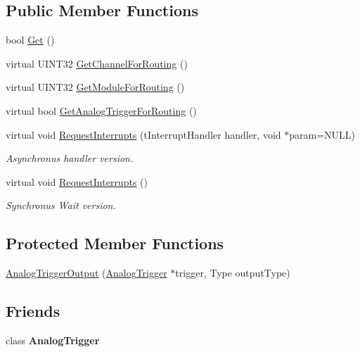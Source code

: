\subsection*{\-Public \-Member \-Functions}
\begin{DoxyCompactItemize}
\item 
bool \hyperlink{classAnalogTriggerOutput_a932c64e6e662803108a6a951b3809ad0}{\-Get} ()
\item 
virtual \-U\-I\-N\-T32 \hyperlink{classAnalogTriggerOutput_a5a3c5233ce579ae4d84098f08abd808a}{\-Get\-Channel\-For\-Routing} ()
\item 
virtual \-U\-I\-N\-T32 \hyperlink{classAnalogTriggerOutput_ae1805118b5d82d7937aadd438df949b8}{\-Get\-Module\-For\-Routing} ()
\item 
virtual bool \hyperlink{classAnalogTriggerOutput_a719c7a65061492d2378f3d5bef2e0275}{\-Get\-Analog\-Trigger\-For\-Routing} ()
\item 
virtual void \hyperlink{classAnalogTriggerOutput_a36ef5c0664731e05e14cc9fad673a0f4}{\-Request\-Interrupts} (t\-Interrupt\-Handler handler, void $\ast$param=\-N\-U\-L\-L)
\begin{DoxyCompactList}\small\item\em \-Asynchronus handler version. \end{DoxyCompactList}\item 
virtual void \hyperlink{classAnalogTriggerOutput_a0630898833f66fcd671e7bb4561e4d81}{\-Request\-Interrupts} ()
\begin{DoxyCompactList}\small\item\em \-Synchronus \-Wait version. \end{DoxyCompactList}\end{DoxyCompactItemize}
\subsection*{\-Protected \-Member \-Functions}
\begin{DoxyCompactItemize}
\item 
\hyperlink{classAnalogTriggerOutput_a1eabb0bac38ac9c3ec1ca6a2ab3050f9}{\-Analog\-Trigger\-Output} (\hyperlink{classAnalogTrigger}{\-Analog\-Trigger} $\ast$trigger, \-Type output\-Type)
\end{DoxyCompactItemize}
\subsection*{\-Friends}
\begin{DoxyCompactItemize}
\item 
\hypertarget{classAnalogTriggerOutput_aaae5addbdfb60c5f834f1cd08e59dadd}{class {\bfseries \-Analog\-Trigger}}\label{classAnalogTriggerOutput_aaae5addbdfb60c5f834f1cd08e59dadd}

\end{DoxyCompactItemize}


